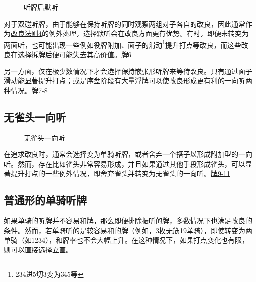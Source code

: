 \begin{figure}
    \caption{听牌后默听} \label{lec3:pai6-8}
    \par\bigskip
    \par\bigskip
\end{figure}

对于双碰听牌，由于能够在保持听牌的同时观察两组对子各自的改良，因此通常作为\hyperref[lec3:rule4]{改良法则4}的例外处理，选择默听会在改良方面更有优势。有时，即便未转变为两面听，也可能出现一些例如役牌附加、面子的滑动\footnote{234进5切3变为345等}提升打点等改良，而这些改良在选择拆牌后便可能失去其高价值。\hyperref[lec3:pai6-8]{牌6}

另一方面，仅在极少数情况下才会选择保持嵌张形听牌来等待改良。只有通过面子滑动能显著提升打点；或是序盘阶段有大量浮牌可以使改良形成更有利的一向听两种情况。\hyperref[lec3:pai6-8]{牌7-8}

\subsection{无雀头一向听}
\begin{figure}
    \caption{无雀头一向听} \label{lec3:pai9-11}
    \par\bigskip
    \par\bigskip
\end{figure}

在追求改良时，通常会选择变为单骑听牌，或者舍弃一个搭子以形成附加型的一向听。然而，存在比如雀头非常容易形成，并且如果通过其他手段形成雀头，可以显著提升打点的一些例外情况，即舍弃雀头并转变为无雀头的一向听。\hyperref[lec3:pai9-11]{牌9-11}

\subsection{普通形的单骑听牌}
如果单骑的听牌并不容易和牌，那么即便排除振听的牌，多数情况下也满足改良的条件。然而，若单骑听的是较容易和的牌（例如，3枚无筋19单骑），即使转变为两单骑（如1234），和牌率也不会大幅上升。在这种情况下，如果打点变化也有限，则可以直接选择立直。

